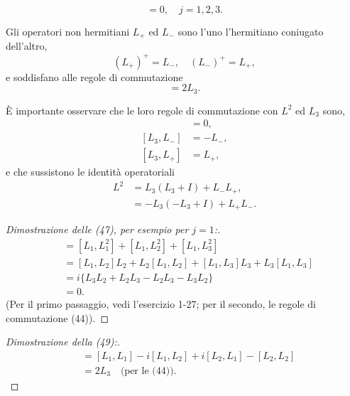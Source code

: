 \documentclass[11pt, a4paper]{book}
\numberwithin{equation}{section}
\begin{document}

\begin{equation}
[L_j, L^2] = 0, \quad j = 1,2,3.
\end{equation}

Gli operatori non hermitiani $L_+$ ed $L_-$ sono l'uno l'hermitiano
coniugato dell'altro,
\begin{equation}
(L_+)^+ = L_-, \quad (L_-)^+ = L_+,
\end{equation}
e soddisfano alle regole di commutazione
\begin{equation}
[L_+, L_-] = 2L_3.
\end{equation}

È importante osservare che le loro regole di commutazione con $L^2$ ed
$L_3$ sono,
\begin{align}
[L^2, L_\pm] &= 0,    \tag{50} \\
[L_3, L_-]   &= -L_-, \tag{51a} \\
[L_3, L_+]   &= L_+,  \tag{51b}
\end{align}
e che sussistono le identità operatoriali
\begin{align}
L^2 &= L_3(L_3+I) + L_-L_+, \tag{52a} \\
    &= -L_3(-L_3+I) + L_+L_-. \tag{52b}
\end{align}

\begin{proof}[Dimostrazione delle (47), per esempio per $j=1$:]
\begin{align*}
[L_1, L^2] &= [L_1, L_1^2] + [L_1, L_2^2] + [L_1, L_3^2] \\
  &= [L_1, L_2]L_2 + L_2[L_1, L_2] + [L_1, L_3]L_3 + L_3[L_1, L_3] \\
  &= i\{L_3 L_2 + L_2 L_3 - L_2 L_3 - L_3 L_2\} \\
  &= 0.
\end{align*}
(Per il primo passaggio, vedi l'esercizio 1-27; per il secondo, le regole
di commutazione (44)).
\end{proof}

\begin{proof}[Dimostrazione della (49):]
\begin{align*}
[L_+, L_-] &= [L_1, L_1] - i[L_1, L_2] + i[L_2, L_1] - [L_2, L_2] \\
            &= 2L_3 \quad \text{(per le (44))}.
\end{align*}
\end{proof}

\end{document}
